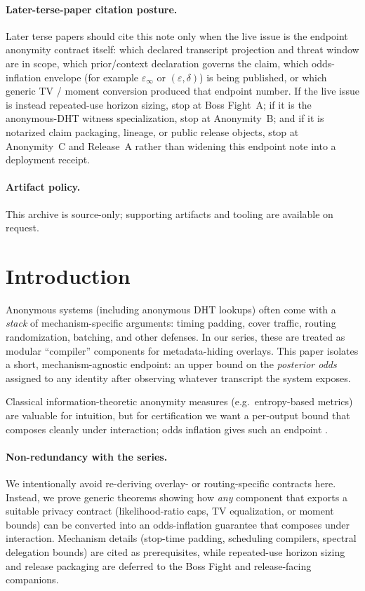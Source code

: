 \documentclass[11pt]{article}
\theoremstyle{definition}
\theoremstyle{remark}
\begin{document}
\paragraph{Later-terse-paper citation posture.}
Later terse papers should cite this note only when the live issue is the endpoint anonymity contract itself: which declared transcript projection and threat window are in scope, which prior/context declaration governs the claim, which odds-inflation envelope (for example $\varepsilon_\infty$ or $(\varepsilon,\delta)$) is being published, or which generic TV / moment conversion produced that endpoint number.
If the live issue is instead repeated-use horizon sizing, stop at Boss Fight~A; if it is the anonymous-DHT witness specialization, stop at Anonymity~B; and if it is notarized claim packaging, lineage, or public release objects, stop at Anonymity~C and Release~A rather than widening this endpoint note into a deployment receipt.\cite{series:bossfightA,series:profiling,series:abomoinl,series:releaseA}

\paragraph{Artifact policy.}
This archive is source-only; supporting artifacts and tooling are available on request.\cite{series:artifactpolicy}


\section{Introduction}
Anonymous systems (including anonymous DHT lookups) often come with a \emph{stack} of mechanism-specific arguments:
timing padding, cover traffic, routing randomization, batching, and other defenses.
In our series, these are treated as modular ``compiler'' components for metadata-hiding overlays.
This paper isolates a short, mechanism-agnostic endpoint: an upper bound on the \emph{posterior odds} assigned to any identity after observing whatever transcript the system exposes.

Classical information-theoretic anonymity measures (e.g.\ entropy-based metrics) are valuable for intuition, but for certification we want a per-output bound that composes cleanly under interaction; odds inflation gives such an endpoint \cite{SerjantovDanezis2002}.

\paragraph{Non-redundancy with the series.}
We intentionally avoid re-deriving overlay- or routing-specific contracts here.
Instead, we prove generic theorems showing how \emph{any} component that exports a suitable privacy contract (likelihood-ratio caps, TV equalization, or moment bounds) can be converted into an odds-inflation guarantee that composes under interaction.
Mechanism details (stop-time padding, scheduling compilers, spectral delegation bounds) are cited as prerequisites, while repeated-use horizon sizing and release packaging are deferred to the Boss Fight and release-facing companions.
\end{document}
